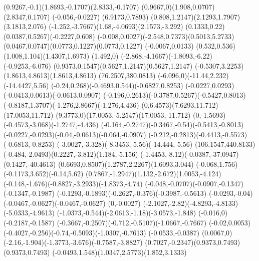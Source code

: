 {    \rcurveto(0.9267,-0.1)(1.8693,-0.1707)(2.8333,-0.1707)
    \rcurveto(0.9667,0)(1.908,0.0707)(2.8347,0.1707)
    \rlineto(-0.056,-0.0227)
    \rlineto(6.9173,0.7893)
    \rcurveto(0.808,1.2147)(2.1293,1.7907)(3.1813,2.076)
    \rcurveto(-1.252,-3.7667)(1.68,-4.0693)(2.1573,-3.292)
    \rcurveto(0.1333,0.22)(0.0387,0.5267)(-0.2227,0.608)
    \rcurveto(-0.008,0.0027)(-2.548,0.7373)(0.5013,5.2733)
    \rcurveto(0.0467,0.0747)(0.0773,0.1227)(0.0773,0.1227)
    \rlineto(-0.0067,0.0133)
    \rcurveto(0.532,0.536)(1.008,1.104)(1.4307,1.6973)
    \rlineto(1.492,0)
    \rcurveto(-2.868,-4.1667)(-1.8093,-6.22)(-0.9253,-6.076)
    \rcurveto(0.9373,0.1547)(0.5627,1.2147)(0.5627,1.2147)
    \rcurveto(-0.5307,3.2253)(1.8613,4.8613)(1.8613,4.8613)
    \moveto(76.2507,380.0813)
    \rcurveto(-6.096,0)(-11.44,2.232)(-14.4427,5.56)
    \rcurveto(-0.24,0.268)(-0.4693,0.544)(-0.6827,0.8253)
    \rcurveto(-0.0227,0.0293)(-0.0413,0.0613)(-0.0613,0.0907)
    \rcurveto(-0.196,0.2613)(-0.3787,0.5267)(-0.5427,0.8013)
    \rcurveto(-0.8187,1.3707)(-1.276,2.8667)(-1.276,4.436)
    \rcurveto(0,6.4573)(7.6293,11.712)(17.0053,11.712)
    \rcurveto(9.3773,0)(17.0053,-5.2547)(17.0053,-11.712)
    \rcurveto(0,-1.5693)(-0.4573,-3.068)(-1.2747,-4.436)
    \rcurveto(-0.164,-0.2747)(-0.3467,-0.54)(-0.5413,-0.8013)
    \rcurveto(-0.0227,-0.0293)(-0.04,-0.0613)(-0.064,-0.0907)
    \rcurveto(-0.212,-0.2813)(-0.4413,-0.5573)(-0.6813,-0.8253)
    \rcurveto(-3.0027,-3.328)(-8.3453,-5.56)(-14.444,-5.56)
    \moveto(106.1547,440.8133)
    \rcurveto(-0.484,-2.0493)(0.2227,-3.812)(1.184,-5.156)
    \rcurveto(-1.4453,-8.12)(-0.0387,-37.0947)(0.1427,-40.4613)
    \rcurveto(0.6693,0.8507)(1.2787,2.2267)(1.6093,3.044)
    \rcurveto(-0.068,1.756)(-0.1173,3.652)(-0.14,5.62)
    \rcurveto(0.7867,-1.2947)(1.132,-2.672)(1.0053,-4.124)
    \rcurveto(-0.148,-1.676)(-0.8827,-3.2933)(-1.8373,-4.74)
    \rcurveto(-0.048,-0.0707)(-0.0907,-0.1347)(-0.1347,-0.1987)
    \rcurveto(-0.1293,-0.1893)(-0.2627,-0.376)(-0.3987,-0.5613)
    \rcurveto(-0.0293,-0.04)(-0.0467,-0.0627)(-0.0467,-0.0627)
    \rlineto(0,-0.0027)
    \rcurveto(-2.1027,-2.82)(-4.8293,-4.8133)(-5.0333,-4.9613)
    \rcurveto(-1.0373,-0.544)(-2.0613,-1.18)(-3.0573,-1.848)
    \rlineto(-0.016,0)
    \rlineto(-0.2187,-0.1587)
    \rcurveto(-0.3667,-0.2507)(-0.712,-0.5107)(-1.0667,-0.7667)
    \rlineto(-0.02,0.0053)
    \rcurveto(-0.4027,-0.256)(-0.74,-0.5093)(-1.0307,-0.7613)
    \rlineto(-0.0533,-0.0387)
    \rlineto(0.0067,0)
    \rcurveto(-2.16,-1.904)(-1.3773,-3.676)(-0.7587,-3.8827)
    \rcurveto(0.7027,-0.2347)(0.9373,0.7493)(0.9373,0.7493)
    \rcurveto(-0.0493,1.548)(1.0347,2.5773)(1.852,3.1333)
}
